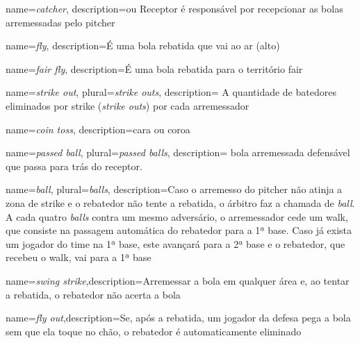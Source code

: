 {
 name=\textit{catcher},
 description={ou Receptor \'e responsável por recepcionar as bolas arremessadas pelo \gls{pitcher}}
}

{
 name=\textit{fly},
 description={\'E uma bola rebatida que vai ao ar (alto)}
}

{
 name=\textit{fair fly},
 description={\'E uma bola rebatida para o territ\'orio \gls{fair}}
}


{
 name=\textit{strike out},
 plural=\textit{strike outs},
 description={ A quantidade de batedores eliminados por \gls{strike} (\textit{strike outs}) por cada arremessador}
}

{
 name=\textit{coin toss},
 description={cara ou coroa}
}

{
 name=\textit{passed ball},
 plural=\textit{passed balls},
 description={ bola arremessada defens\'avel que passa para tr\'as do receptor.}
}

{ 	name=\textit{ball},
	plural=\textit{balls},
	description={Caso o arremesso do \gls{pitcher} não atinja a zona de \gls{strike} e o rebatedor não tente a rebatida, o árbitro faz a chamada de \textit{ball}. A cada quatro \textit{balls} contra um mesmo adversário, o arremessador cede um \gls{walk}, que consiste na passagem automática do rebatedor para a 1ª base. Caso já exista um jogador do time na 1ª base, este avançará para a 2ª base e o rebatedor, que recebeu o \gls{walk}, vai para a 1ª base}
}

{ name=\textit{swing strike},description={Arremessar a bola em qualquer área e, ao tentar a rebatida, o rebatedor não acerta a bola}}


{ name=\textit{fly out},description={Se, após a rebatida, um jogador da defesa pega a bola sem que ela toque no chão, o rebatedor é automaticamente eliminado}}





